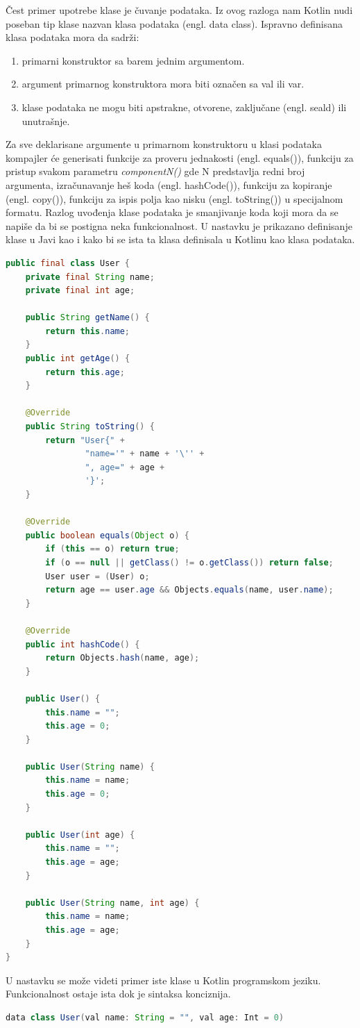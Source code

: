 \documentclass[12pt,oneside]{memoir}
\begin{document}
Čest primer upotrebe klase je čuvanje podataka. Iz ovog razloga nam Kotlin nudi poseban tip klase nazvan klasa podataka (engl. data class). Ispravno definisana klasa podataka mora da sadrži:
\begin{enumerate}
  \item primarni konstruktor sa barem jednim argumentom.
  \item argument primarnog konstruktora mora biti označen sa val ili var.
  \item klase podataka ne mogu biti apstrakne, otvorene, zaključane (engl. seald) ili unutrašnje.
\end{enumerate}


Za sve deklarisane argumente u primarnom konstruktoru u klasi podataka kompajler će generisati funkcije za proveru jednakosti (engl. equals()), funkciju za pristup svakom parametru \emph{componentN()} gde N predstavlja redni broj argumenta, izračunavanje heš koda (engl. hashCode()), funkciju za kopiranje (engl. copy()), funkciju za ispis polja kao nisku (engl. toString()) u specijalnom formatu. Razlog uvođenja klase podataka je smanjivanje koda koji mora da se napiše da bi se postigna neka funkcionalnost. U nastavku je prikazano definisanje klase u Javi kao i kako bi se ista ta klasa definisala u Kotlinu kao klasa podataka.

\begin{lstlisting}[caption={Java klasa},captionpos=t, language=Java]
  public final class User {
    private final String name;
    private final int age;

    public String getName() {
        return this.name;
    }
    public int getAge() {
        return this.age;
    }

    @Override
    public String toString() {
        return "User{" +
                "name='" + name + '\'' +
                ", age=" + age +
                '}';
    }

    @Override
    public boolean equals(Object o) {
        if (this == o) return true;
        if (o == null || getClass() != o.getClass()) return false;
        User user = (User) o;
        return age == user.age && Objects.equals(name, user.name);
    }

    @Override
    public int hashCode() {
        return Objects.hash(name, age);
    }

    public User() {
        this.name = "";
        this.age = 0;
    }

    public User(String name) {
        this.name = name;
        this.age = 0;
    }

    public User(int age) {
        this.name = "";
        this.age = age;
    }

    public User(String name, int age) {
        this.name = name;
        this.age = age;
    }
}
\end{lstlisting}
U nastavku se može videti primer iste klase u Kotlin programskom jeziku. Funkcionalnost ostaje ista dok je sintaksa konciznija.
\begin{lstlisting}[caption={Kotlin klasa},captionpos=t, language=Java]
data class User(val name: String = "", val age: Int = 0)
\end{lstlisting}
\end{document}
